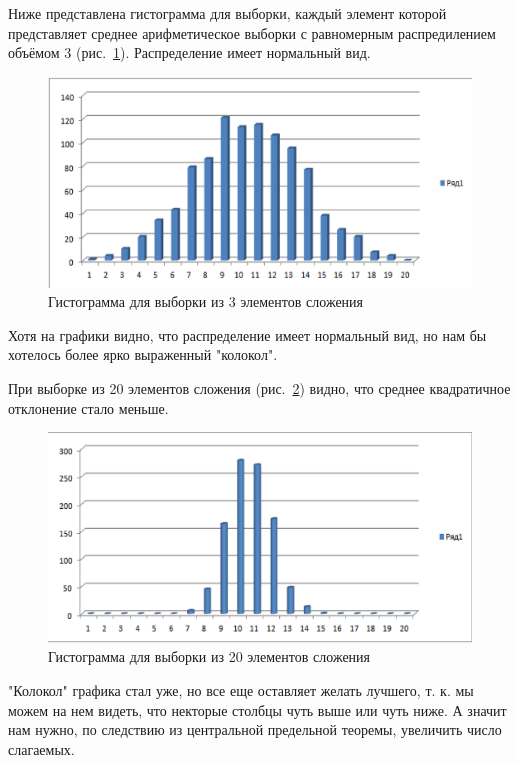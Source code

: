\documentclass[a4paper,12pt]{article}
\begin{document}
Ниже представлена гистограмма для выборки, каждый элемент которой представляет среднее арифметическое выборки с равномерным распредилением объёмом 3 (рис.~\ref{fig:im_1}). Распределение имеет нормальный вид.
\begin{center}
	\begin{figure}[h]
	    \centering
   		\includegraphics[scale=0.3]{figure_1.png}
   		\caption{Гистограмма для выборки из 3 элементов сложения}
   		\label{fig:im_1}
    \end{figure}
\end{center}
Хотя на графики видно, что распределение имеет нормальный вид, но нам бы хотелось более ярко выраженный "колокол".

\newpage
При выборке из 20 элементов сложения (рис.~\ref{fig:im_2}) видно, что среднее квадратичное отклонение стало меньше.
\begin{center}
	\begin{figure}[h]
		\centering
   		\includegraphics[scale=0.3]{figure_2.png}
   		\caption{Гистограмма для выборки из 20 элементов сложения}
   		\label{fig:im_2}
    \end{figure}
\end{center}
"Колокол" графика стал уже, но все еще оставляет желать лучшего, т. к. мы можем на нем видеть, что некторые столбцы чуть выше или чуть ниже. А значит нам нужно, по следствию из центральной предельной теоремы, увеличить число слагаемых.
\end{document}

